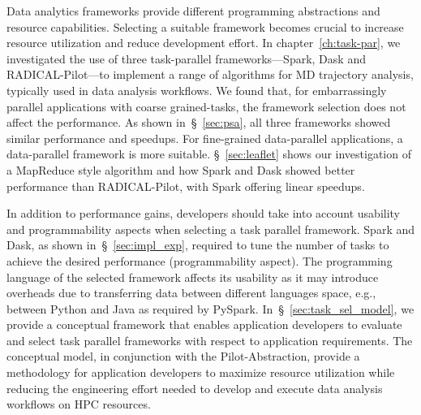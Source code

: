 Data analytics frameworks provide different programming abstractions and
resource capabilities. Selecting a suitable framework becomes crucial to
increase resource utilization and reduce development effort.
In chapter~\ref{ch:task-par}, we investigated the use of three task-parallel
frameworks---Spark, Dask and RADICAL-Pilot---to implement a range of algorithms
for MD trajectory analysis, typically used in data analysis workflows. We found
that, for embarrassingly parallel applications with coarse  grained-tasks, the
framework selection does not affect the performance. As shown
in~\S~\ref{sec:psa}, all three frameworks showed similar performance and
speedups. For fine-grained data-parallel applications, a  data-parallel
framework is more suitable. \S~\ref{sec:leaflet} shows our investigation of a
MapReduce style algorithm and how Spark and Dask showed better performance than
RADICAL-Pilot, with Spark offering linear speedups.

In addition to performance gains, developers should take into account usability
and programmability aspects when selecting a task parallel framework. Spark and
Dask, as shown in~\S~\ref{sec:impl_exp}, required to tune the number of tasks to
achieve the desired performance (programmability aspect). The programming
language of the selected framework affects its usability as it may introduce
overheads due to transferring data between different languages space, e.g.,
between Python and Java as required by PySpark. In~\S~\ref{sec:task_sel_model},
we provide a conceptual framework that enables application developers to
evaluate and select task parallel frameworks with respect to application
requirements. The conceptual model, in conjunction with the Pilot-Abstraction,
provide a methodology for application developers to maximize resource utilization
while reducing the engineering effort needed to develop and execute data analysis
workflows on HPC resources.

